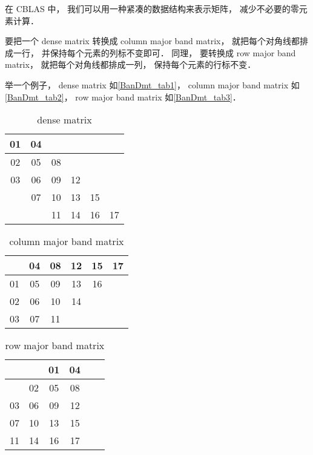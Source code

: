 
\begin{issues}
\issueDraft
\issueMissDepend
\end{issues}


在 CBLAS 中， 我们可以用一种紧凑的数据结构来表示矩阵， 减少不必要的零元素计算．

要把一个 dense matrix 转换成 column major band matrix， 就把每个对角线都排成一行， 并保持每个元素的列标不变即可． 同理， 要转换成 row major band matrix， 就把每个对角线都排成一列， 保持每个元素的行标不变．

举一个例子， dense matrix 如\autoref{BanDmt_tab1}， column major band matrix 如\autoref{BanDmt_tab2}， row major band matrix 如\autoref{BanDmt_tab3}．

\begin{table}[ht]
\centering
\caption{dense matrix}\label{BanDmt_tab1}
\begin{tabular}{|c|c|c|c|c|c|}
\hline
01  & 04  &    &    &    &   \\
\hline
02  & 05  & 08  &    &    &   \\
\hline
03  & 06  & 09  & 12  &    &   \\
\hline
   & 07  & 10 &  13  & 15  &   \\
\hline
   &    & 11 &  14  & 16  & 17 \\
\hline
\end{tabular}
\end{table}

\begin{table}[ht]
\centering
\caption{column major band matrix}\label{BanDmt_tab2}
\begin{tabular}{|c|c|c|c|c|c|}
\hline
   & 04  & 08  & 12 &  15 &  17 \\
\hline
01  & 05  & 09  & 13 &  16 &    \\
\hline
02  & 06  & 10 & 14 &     &    \\
\hline
03  & 07  & 11 &    &     &    \\
\hline
\end{tabular}
\end{table}

\begin{table}[ht]
\centering
\caption{row major band matrix}\label{BanDmt_tab3}
\begin{tabular}{|c|c|c|c|c|c|}
\hline
   &     &  01  &  04 \\
\hline
   &  02  &  05  &  08 \\
\hline
03  &  06  &  09  &  12 \\
\hline
07  &  10 &  13 &  15 \\
\hline
11 &  14 &  16 &  17 \\
\hline
\end{tabular}
\end{table}

